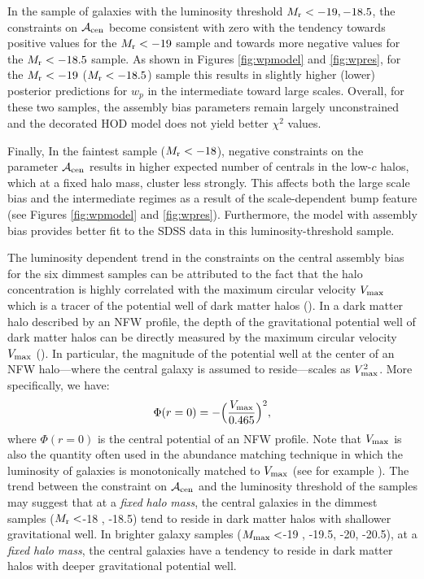 \documentclass[twocolumn]{aastex61}
\newcommand{\beq}{\begin{equation}}
\newcommand{\eeq}{\end{equation}}
\newcommand{\acen}{\mathcal{A}_{\rm cen}}
\begin{document}
In the sample of galaxies with the luminosity threshold $M_{\rm r} < -19, -18.5$, the constraints on $\acen$ become consistent with zero with the tendency towards positive values for the $M_{\rm r}<-19$ sample and towards more negative values for the $M_{\rm r }<-18.5$ sample. As shown in Figures \ref{fig:wpmodel} and \ref{fig:wpres}, for the $M_{\rm r}<-19$ ($M_{\rm r}<-18.5$) sample this results in slightly higher (lower) posterior predictions for $w_{p}$ in the intermediate toward large scales. Overall, for these two samples, the assembly bias parameters remain largely unconstrained and the decorated HOD model does not yield better $\chi^{2}$ values. 

Finally, In the faintest sample ($M_{\rm r} < -18$), negative constraints on the parameter $\acen$ results in higher expected number of centrals in the low-$c$ halos, which at a fixed halo mass, cluster less strongly. This affects both the large scale bias and the intermediate regimes as a result of the scale-dependent bump feature (see Figures \ref{fig:wpmodel} and \ref{fig:wpres}). Furthermore, the model with assembly bias provides better fit to the SDSS data in this luminosity-threshold sample. 

The luminosity dependent trend in the constraints on the central assembly bias for the six dimmest samples can be attributed to the fact that the halo concentration is highly correlated with the maximum circular velocity $V_{\rm max}$ which is a tracer of the potential well of dark matter halos (\citealt{prada2012}). In a dark matter halo described by an NFW profile, the depth of the gravitational potential well of dark matter halos can be directly measured by the maximum circular velocity $V_{\rm max}$ (\citealt{vmax_potential}). In particular, the magnitude of the potential well at the center of an NFW halo---where the central galaxy is assumed to reside---scales as $V_{\rm max}^{2}$. More specifically, we have:
\beq
\Phi(r=0) = -\Big(\frac{V_{\rm max}}{0.465}\Big)^{2},
\eeq
 where $\Phi(r=0)$ is the central potential of an NFW profile. Note that $V_{\rm max}$ is also the quantity often used in the abundance matching technique in which the luminosity of galaxies is monotonically matched to $V_{\rm max}$ (see for example \citealt{reddick2013,lehman2015, hod_vs_sham, halodemographic}). The trend between the constraint on $\acen$ and the luminosity threshold of the samples may suggest that at a \emph{fixed} \emph{halo} \emph{mass}, the central galaxies in the dimmest samples ($M_{\rm r}<$-18 , -18.5) tend to reside in dark matter halos with shallower gravitational well. In brighter galaxy samples ($M_{\rm max}<$-19 , -19.5, -20, -20.5), at a \emph{fixed} \emph{halo} \emph{mass}, the central galaxies have a tendency to reside in dark matter halos with deeper gravitational potential well. 
\end{document}
